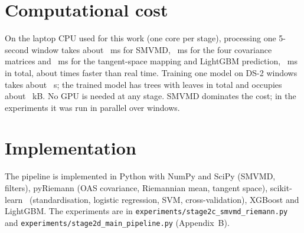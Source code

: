 \section{Computational cost}
\label{sec:cost}
On the laptop CPU used for this work (one core per stage), processing one 5-second window takes
about ~ms for SMVMD, ~ms for the four covariance matrices and ~ms for
the tangent-space mapping and LightGBM prediction, ~ms in total, about
 times faster than real time. Training one model on  DS-2 windows
takes about ~s; the trained model has  trees with  leaves in
total and occupies about ~kB. No GPU is needed at any stage. SMVMD dominates the
cost; in the experiments it was run in parallel over windows.

\section{Implementation}
The pipeline is implemented in Python with NumPy and SciPy (SMVMD, filters), pyRiemann (OAS
covariance, Riemannian mean, tangent space), scikit-learn~\cite{pedregosa2011} (standardisation,
logistic regression, SVM, cross-validation), XGBoost and LightGBM. The experiments are in
\texttt{experiments/stage2c\_smvmd\_riemann.py} and \texttt{experiments/stage2d\_main\_pipeline.py}
(Appendix~B).
